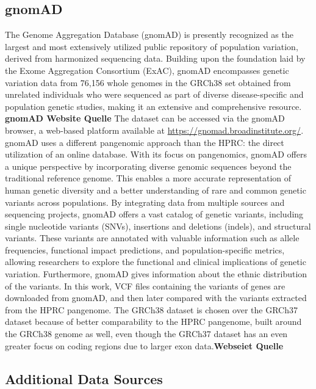 \subsection{gnomAD}
The Genome Aggregation Database (gnomAD) is presently recognized as the largest and most extensively utilized public repository of population variation, derived from harmonized sequencing data. \cite{gudmundsson2022variant}
Building upon the foundation laid by the Exome Aggregation Consortium (ExAC), gnomAD encompasses genetic variation data from 76,156 whole genomes in the GRCh38 set obtained from unrelated individuals who were sequenced as part of diverse disease-specific and population genetic studies, making it an extensive and comprehensive resource. \cite{koch2020exploring}\textbf{gnomAD Website Quelle}
The dataset can be accessed via the gnomAD browser, a web-based platform available at \href{https://gnomad.broadinstitute.org/}{https://gnomad.broadinstitute.org/}.
gnomAD uses a different pangenomic approach than the HPRC: the direct utilization of an online database.
With its focus on pangenomics, gnomAD offers a unique perspective by incorporating diverse genomic sequences beyond the traditional reference genome. This enables a more accurate representation of human genetic diversity and a better understanding of rare and common genetic variants across populations.
By integrating data from multiple sources and sequencing projects, gnomAD offers a vast catalog of genetic variants, including single nucleotide variants (SNVs), insertions and deletions (indels), and structural variants. These variants are annotated with valuable information such as allele frequencies, functional impact predictions, and population-specific metrics, allowing researchers to explore the functional and clinical implications of genetic variation.
Furthermore, gnomAD gives information about the ethnic distribution of the variants.
In this work, VCF files containing the variants of genes are downloaded from gnomAD, and then later compared with the variants extracted from the HPRC pangenome. The GRCh38 dataset is chosen over the GRCh37 dataset because of better comparability to the HPRC pangenome, built around the GRCh38 genome as well, even though the GRCh37 dataset has an even greater focus on coding regions due to larger exon data.\textbf{Webseiet Quelle}

\subsection{Additional Data Sources}

